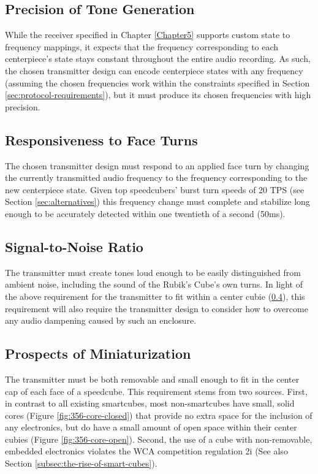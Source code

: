 \subsection{Precision of Tone Generation}
\label{subsec:precision-of-tone-generation}

While the receiver specified in Chapter \ref{Chapter5} supports custom
state to frequency mappings, it expects that the frequency
corresponding to each centerpiece's state stays constant throughout the
entire audio recording. As such, the chosen transmitter design can
encode centerpiece states with any frequency (assuming the chosen
frequencies work within the constraints specified in Section
\ref{sec:protocol-requirements}), but it must produce its chosen
frequencies with high precision.

\subsection{Responsiveness to Face Turns}
\label{subsec:responsiveness-to-face-turns}

The chosen transmitter design must respond to an applied face turn by
changing the currently transmitted audio frequency to the frequency
corresponding to the new centerpiece state. Given top speedcubers'
burst turn speeds of 20 TPS (see Section \ref{sec:alternatives}) this
frequency change must complete and stabilize long enough to be
accurately detected within one twentieth of a second (50ms).

\subsection{Signal-to-Noise Ratio}
\label{subsec:transmitter-signal-to-noise-ratio}

The transmitter must create tones loud enough to be easily
distinguished from ambient noise, including the sound of the Rubik's
Cube's own turns. In light of the above requirement for the transmitter
to fit within a center cubie
(\ref{subsec:prospects-of-miniaturization}), this requirement will also
require the transmitter design to consider how to overcome any audio
dampening caused by such an enclosure.

\subsection{Prospects of Miniaturization}
\label{subsec:prospects-of-miniaturization}

The transmitter must be both removable and small enough to fit in the
center cap of each face of a speedcube. This requirement stems from two
sources. First, in contrast to all existing smartcubes, most
non-smartcubes have small, solid cores (Figure
\ref{fig:356-core-closed}) that provide no extra space for the
inclusion of any electronics, but do have a small amount of open space
within their center cubies (Figure \ref{fig:356-core-open}). Second,
the use of a cube with non-removable, embedded electronics violates the
WCA competition regulation 2i \cite{wca-regulations} (See also Section
\ref{subsec:the-rise-of-smart-cubes}).

